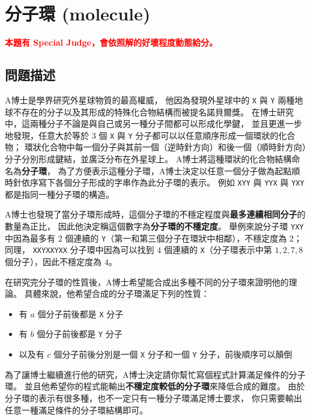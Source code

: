 \section{分子環 (molecule)}

\textcolor{red}{\textbf{本題有 Special Judge，會依照解的好壞程度動態給分。}}

\subsection{問題描述}

A博士是學界研究外星球物質的最高權威， 他因為發現外星球中的 \texttt{X} 與
\texttt{Y}
兩種地球不存在的分子以及其形成的特殊化合物結構而被提名諾貝爾獎。
在博士研究中，這兩種分子不論是與自己或另一種分子間都可以形成化學鍵，
並且更進一步地發現，任意大於等於 \(3\) 個 \texttt{X} 與 \texttt{Y}
分子都可以以任意順序形成一個環狀的化合物；
環狀化合物中每一個分子與其前一個（逆時針方向）和後一個（順時針方向）分子分別形成鍵結，並廣泛分布在外星球上。
A博士將這種環狀的化合物結構命名為\textbf{分子環}，
為了方便表示這種分子環，A博士決定以任意一個分子做為起點順時針依序寫下各個分子形成的字串作為此分子環的表示。
例如 \texttt{XYY} 與 \texttt{YYX} 與 \texttt{YXY}
都是指同一種分子環的構造。

A博士也發現了當分子環形成時，這個分子環的不穩定程度與\textbf{最多連續相同分子}的數量為正比，
因此他決定稱這個數字為\textbf{分子環的不穩定度}。 舉例來說分子環
\texttt{YXY} 中因為最多有 \(2\) 個連續的
\texttt{Y}（第一和第三個分子在環狀中相鄰），不穩定度為 \(2\)； 同理，
\texttt{XXYXXYXX} 分子環中因為可以找到 \(4\) 個連續的
\texttt{X}（分子環表示中第 \(1, 2, 7, 8\) 個分子），因此不穩定度為
\(4\)。

在研究完分子環的性質後，A博士希望能合成出多種不同的分子環來證明他的理論。
具體來說，他希望合成的分子環滿足下列的性質：

\begin{itemize}
\tightlist
\item
  有 \(a\) 個分子前後都是 \texttt{X} 分子
\item
  有 \(b\) 個分子前後都是 \texttt{Y} 分子
\item
  以及有 \(c\) 個分子前後分別是一個 \texttt{X} 分子和一個 \texttt{Y}
  分子，前後順序可以顛倒
\end{itemize}

為了讓博士繼續進行他的研究，A博士決定請你幫忙寫個程式計算滿足條件的分子環。
並且他希望你的程式能輸出\textbf{不穩定度較低的分子環}來降低合成的難度。
由於分子環的表示有很多種，也不一定只有一種分子環滿足博士要求，
你只需要輸出任意一種滿足條件的分子環結構即可。

